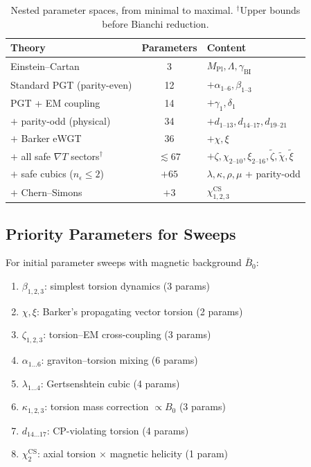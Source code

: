 \documentclass[12pt,a4paper]{article}
\newcommand{\del}{\nabla}            %
\newcommand{\Mpl}{M_{\mathrm{Pl}}}  %
\begin{document}
\begin{table}[htbp]
\centering
\caption{Nested parameter spaces, from minimal to maximal.
  $^\dagger$Upper bounds before Bianchi reduction.}
\label{tab:hierarchy}
\small
\begin{tabular}{@{}lcl@{}}
\toprule
\textbf{Theory} & \textbf{Parameters} & \textbf{Content} \\
\midrule
Einstein--Cartan & 3 & $\Mpl, \Lambda, \gamma_{\text{BI}}$ \\
Standard PGT (parity-even) & 12 & $+ \alpha_{1\text{--}6}, \beta_{1\text{--}3}$ \\
PGT + EM coupling & 14 & $+ \gamma_1, \delta_1$ \\
$+$ parity-odd (physical) & 34 & $+ d_{1\text{--}13}, d_{14\text{--}17}, d_{19\text{--}21}$ \\
$+$ Barker eWGT & 36 & $+ \chi, \xi$ \\
$+$ all safe $\del T$ sectors$^\dagger$ & $\lesssim 67$ & $+ \zeta, \chi_{2\text{--}10}, \xi_{2\text{--}16},
  \tilde{\zeta}, \tilde{\chi}, \tilde{\xi}$ \\
$+$ safe cubics ($n_\epsilon \leq 2$) & $+65$ & $\lambda, \kappa, \rho, \mu$ + parity-odd \\
$+$ Chern--Simons & $+3$ & $\chi^{\text{CS}}_{1,2,3}$ \\
\bottomrule
\end{tabular}
\end{table}


\subsection{Priority Parameters for Sweeps}

For initial parameter sweeps with magnetic background $\bar{B}_0$:
\begin{enumerate}
  \item $\beta_{1,2,3}$: simplest torsion dynamics (3 params)
  \item $\chi, \xi$: Barker's propagating vector torsion (2 params)
  \item $\zeta_{1,2,3}$: torsion--EM cross-coupling (3 params)
  \item $\alpha_{1\ldots 6}$: graviton--torsion mixing (6 params)
  \item $\lambda_{1\ldots 4}$: Gertsenshtein cubic (4 params)
  \item $\kappa_{1,2,3}$: torsion mass correction $\propto B_0$ (3 params)
  \item $d_{14\ldots 17}$: CP-violating torsion (4 params)
  \item $\chi^{\text{CS}}_2$: axial torsion $\times$ magnetic helicity (1 param)
\end{enumerate}
\end{document}
